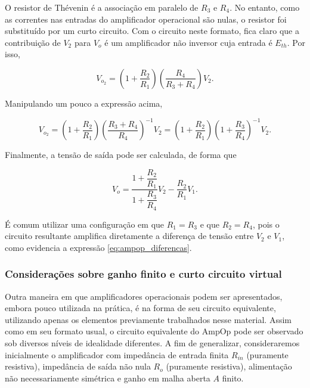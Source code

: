 \documentclass{article}
\numberwithin{equation}{section}
\let\l\left
\let\r\right
\let\dfr\dfrac
\begin{document}
\begin{center}
\end{center}

\noindent O resistor de Thévenin é a associação em paralelo de $R_3$ e $R_4$. No entanto, como as correntes nas entradas do amplificador operacional são nulas, o resistor foi substituído por um curto circuito. Com o circuito neste formato, fica claro que a contribuição de $V_2$ para $V_o$ é um amplificador não inversor cuja entrada é $E_{th}$. Por isso,

\begin{equation}
    V_{o_2} = \l(1+\dfr{R_2}{R_1}\r) \l(\dfr{R_4}{R_3+R_4}\r) V_2.
\end{equation}

\noindent Manipulando um pouco a expressão acima,

\begin{equation}
    V_{o_2} = \l(1+\dfr{R_2}{R_1}\r) \l(\dfr{R_3+R_4}{R_4}\r)^{-1} V_2 = \l(1+\dfr{R_2}{R_1}\r) \l(1+\dfr{R_3}{R_4}\r)^{-1} V_2.
\end{equation}

\noindent Finalmente, a tensão de saída pode ser calculada, de forma que

\begin{equation}
    V_o = \dfr{1+\dfr{R_2}{R_1}}{1+\dfr{R_3}{R_4}}V_2 - \dfr{R_2}{R_1}V_1.
\end{equation}

\noindent É comum utilizar uma configuração em que $R_1=R_3$ e que $R_2=R_4$, pois o circuito resultante amplifica diretamente a diferença de tensão entre $V_2$ e $V_1$, como evidencia a expressão \eqref{eq:ampop_diferencas}.

\subsubsection{Considerações sobre ganho finito e curto circuito virtual}

Outra maneira em que amplificadores operacionais podem ser apresentados, embora pouco utilizada na prática, é na forma de seu circuito equivalente, utilizando apenas os elementos previamente trabalhados nesse material. Assim como em seu formato usual, o circuito equivalente do AmpOp pode ser observado sob diversos níveis de idealidade diferentes. A fim de generalizar, consideraremos inicialmente o amplificador com impedância de entrada finita $R_{in}$ (puramente resistiva), impedância de saída não nula $R_o$ (puramente resistiva), alimentação não necessariamente simétrica e ganho em malha aberta $A$ finito.
\end{document}
